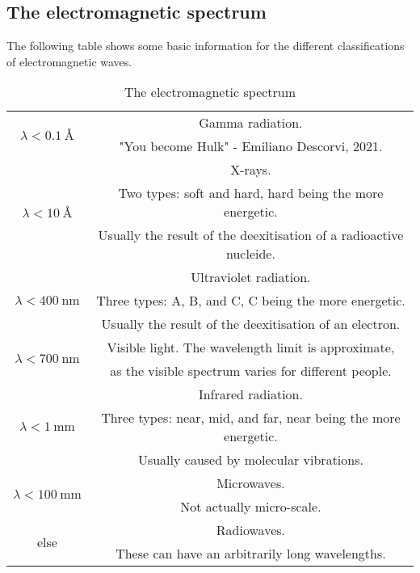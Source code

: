 \subsection{The electromagnetic spectrum}
    The following table shows some basic information for the different classifications of electromagnetic waves.
    \begin{longtable}[c]{@{}c|c@{}} 
        \caption{The electromagnetic spectrum}    
        \endfirsthead
        \hline
        \multirow{2}{*}{$\displaystyle\lambda < \SI{0.1}{\angstrom}$}
         & Gamma radiation. \\
         &"You become Hulk" - Emiliano Descorvi, 2021.\\
        \hline    
        \multirow{3}{*}{$\displaystyle\lambda < \SI{10}{\angstrom}$}
         & X-rays. \\
         & Two types: soft and hard, hard being the more energetic. \\
         & Usually the result of the deexitisation of a radioactive nucleide. \\
        \hline
        \multirow{3}{*}{$\displaystyle\lambda < \SI{400}{\nano\metre}$}
         & Ultraviolet radiation. \\
         & Three types: A, B, and C, C being the more energetic. \\
         & Usually the result of the deexitisation of an electron.\\
        \hline
        \multirow{2}{*}{$\displaystyle\lambda < \SI{700}{\nano\metre}$}
         & Visible light. The wavelength limit is approximate, \\
         & as the visible spectrum varies for different people.\\
        \hline
        \multirow{3}{*}{$\displaystyle\lambda < \SI{1}{\milli\metre}$}
         & Infrared radiation. \\
         & Three types: near, mid, and far, near being the more energetic. \\
         & Usually caused by molecular vibrations.\\
        \hline
        \multirow{2}{*}{$\displaystyle\lambda < \SI{100}{\milli\metre}$}
         & Microwaves.\\
         & Not actually micro-scale.\\
        \hline
        \multirow{2}{*}{else}
         & Radiowaves. \\
         & These can have an arbitrarily long wavelengths.\\
        \hline
    \end{longtable}

